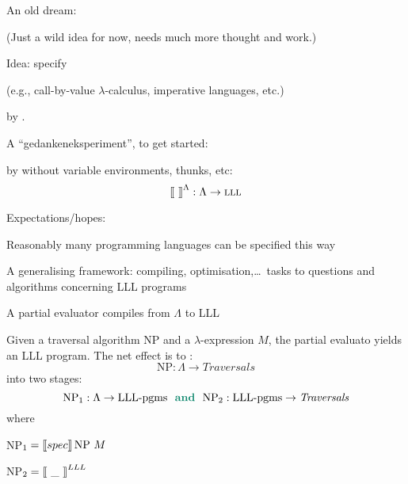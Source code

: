 \documentclass[12pt,fleqn,landscape]{article}
\begin{document}

\begin{slide}{An old dream: \\
 }

(Just a wild idea for now, needs much more thought and work.)
\vair\vair

Idea: specify 
\vair

\hfill (e.g., call-by-value $\lambda$-calculus, imperative languages, etc.) 
\vair

by . 
\vair\vair

A ``gedankeneksperiment'', to get started: 
\vair\vair

by  without variable environments, thunks, etc:
$$
\mbox{$\lbrack\hspace{-0.3ex}\lbrack$}\ \mbox{$\rbrack\hspace{-0.3ex}\rbrack$}^\Lambda : \Lambda \to \mbox{\sc lll}
$$


Expectations/hopes:
\bi

\item Reasonably many  programming languages can be specified this way


\item A generalising  framework: compiling, optimisation,\ldots\ tasks  to questions and algorithms  
concerning  LLL programs

 

\ei





\end{slide}




\begin{slide}{A partial evaluator  compiles from $\Lambda$ to LLL}

Given a traversal algorithm NP and a $\lambda$-expression $M$,  the partial evaluato
yields an LLL program. The net effect is to  :
$$
\mbox{NP} : \Lambda \to \mathit{Traversals}
$$
into two stages:
$$
\mbox{NP}_1 : \Lambda \to  \mbox{LLL-pgms} \mbox{\ \ \vertt{and}\ \ }  \mbox{NP}_2 : \mbox{LLL-pgms} \to \mathit{Traversals}
$$
\vair
where
\bi
\item \mbox{NP}$_1 = \lsem \lowercase{spec}\rsem \, \mbox{NP}\ M$
\vair

\hfill {}
\vair\vair

\item \mbox{NP}$_2 =  \mbox{$\lbrack\hspace{-0.3ex}\lbrack$}\ \_\ \mbox{$\rbrack\hspace{-0.3ex}\rbrack$}^{LLL}$ \hfill {}
\ei\end{slide}


\end{document}

